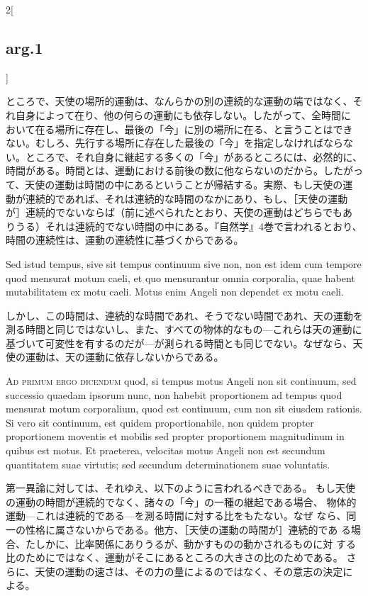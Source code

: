 \documentclass[paper=a4paper,fontsize=10pt,jafontsize=9pt,titlepage]{jlreq}
\begin{document}
\begin{paracol}{2}[\subsection{arg.1}]
\switchcolumn

ところで、天使の場所的運動は、なんらかの別の連続的な運動の端ではなく、そ
 れ自身によって在り、他の何らの運動にも依存しない。したがって、全時間に
 おいて在る場所に存在し、最後の「今」に別の場所に在る、と言うことはでき
 ない。むしろ、先行する場所に存在した最後の「今」を指定しなければならな
 い。ところで、それ自身に継起する多くの「今」があるところには、必然的に、
 時間がある。時間とは、運動における前後の数に他ならないのだから。したがっ
 て、天使の運動は時間の中にあるということが帰結する。実際、もし天使の運
 動が連続的であれば、それは連続的な時間のなかにあり、もし、［天使の運動
 が］連続的でないならば（前に述べられたとおり、天使の運動はどちらでもあ
 りうる）それは連続的でない時間の中にある。『自然学』4巻で言われるとおり、
 時間の連続性は、運動の連続性に基づくからである。

\switchcolumn*

Sed istud tempus, sive sit tempus continuum sive
non, non est idem cum tempore quod mensurat motum caeli, et quo
mensurantur omnia corporalia, quae habent mutabilitatem ex motu
caeli. Motus enim Angeli non dependet ex motu caeli.

\switchcolumn

しかし、この時間は、連続的な時間であれ、そうでない時間であれ、天の運動を
 測る時間と同じではないし、また、すべての物体的なもの---これらは天の運動に
 基づいて可変性を有するのだが---が測られる時間とも同じでない。なぜなら、天
 使の運動は、天の運動に依存しないからである。

\switchcolumn*[\subsection{ad.1}]

{\scshape Ad primum ergo dicendum} quod, si tempus motus
Angeli non sit continuum, sed successio quaedam ipsorum nunc, non
habebit proportionem ad tempus quod mensurat motum corporalium, quod est
continuum, cum non sit eiusdem rationis. Si vero sit continuum, est
quidem proportionabile, non quidem propter proportionem moventis et
mobilis sed propter proportionem magnitudinum in quibus est motus. Et
praeterea, velocitas motus Angeli non est secundum quantitatem suae
virtutis; sed secundum determinationem suae voluntatis.

\switchcolumn

第一異論に対しては、それゆえ、以下のように言われるべきである。
もし天使の運動の時間が連続的でなく、諸々の「今」の一種の継起である場合、
 物体的運動---これは連続的である---を測る時間に対する比をもたない。なぜ
 なら、同一の性格に属さないからである。他方、［天使の運動の時間が］連続的であ
 る場合、たしかに、比率関係にありうるが、動かすものの動かされるものに対
 する比のためにではなく、運動がそこにあるところの大きさの比のためである。
さらに、天使の運動の速さは、その力の量によるのではなく、その意志の決定に
 よる。


\end{paracol}
\end{document}
